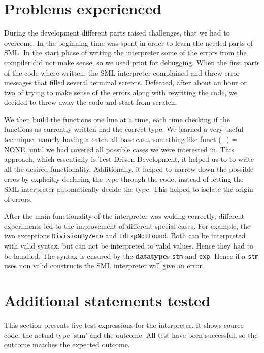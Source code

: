 \documentclass[a4paper]{article}
\begin{document}
\section{Problems experienced}

During the development different parts raised challenges, that we had to overcome. In the beginning time was spent in order to learn the needed parts of SML. In the start phase of writing the interpreter some of the errors from the compiler did not make sense, so we used print for debugging. When the first parts of the code where written, the SML interpreter complained and threw error messages that filled several terminal screens. Defeated, after about an hour or two of trying to make sense of the errors along with rewriting the code, we decided to throw away the code and start from scratch. 

We then build the functions one line at a time, each time checking if the functions as currently written had the correct type. We learned a very useful technique, namely having a catch all base case, something like funct (\_) = NONE, until we had covered all possible cases we were interested in. This approach, which essentially is Test Driven Development, it helped us to to write all the desired functionality. Additionally, it helped to narrow down the possible erros by explicitly declaring the type through the code, instead of letting the SML interpreter automatically decide the type. This helped to isolate the origin of errors.

After the main functionality of the interpreter was woking correctly, different experiments led to the improvement of different special cases. For example, the two exceptions \texttt{DivisionByZero} and \texttt{IdExpNotFound}. Both can be interpreted with valid syntax, but can not be interpreted to valid values. Hence they had to be handled. The syntax is ensured by the \textbf{datatype}s \texttt{stm} and \texttt{exp}. Hence if a \texttt{stm} uses non valid constructs the SML interpreter will give an error.



\section{Additional statements tested}

This section presents five test expressions for the interpreter. It shows source code, the actual type 'stm' and the outcome. All test have been successful, so the outcome matches the expected outcome. 
\end{document}
